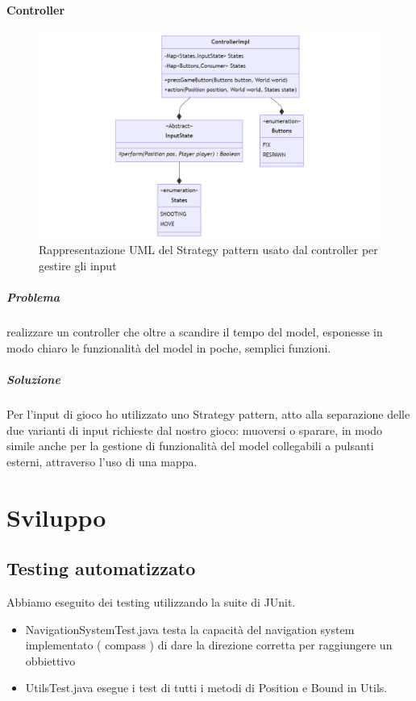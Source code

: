 \documentclass[a4paper,12pt]{report}
\begin{document}
\subsubsection*{Controller}
\begin{figure}[H]
	\centering{}
	\includegraphics[width=\textwidth]{img/Controller.png}
	\caption{Rappresentazione UML del Strategy pattern usato dal controller per gestire gli input}
	\label{img:Controller}
\end{figure}
\paragraph{Problema} realizzare un controller che oltre a scandire il tempo del model, esponesse in modo chiaro le funzionalità del model in poche, semplici funzioni.
\paragraph{Soluzione} Per l'input di gioco ho utilizzato uno Strategy pattern, atto alla separazione delle due varianti di input richieste dal nostro gioco: muoversi o sparare, in modo simile anche per la gestione di funzionalità del model collegabili a pulsanti esterni, attraverso l'uso di una mappa.

\chapter{Sviluppo}
\section{Testing automatizzato}

Abbiamo eseguito dei testing utilizzando la suite di JUnit.
%
\begin{itemize}
	\item NavigationSystemTest.java testa la capacità del navigation system implementato ( compass ) di dare la direzione corretta per raggiungere un obbiettivo
	\item UtilsTest.java esegue i test di tutti i metodi di Position e Bound in Utils.
\end{itemize}
\end{document}
